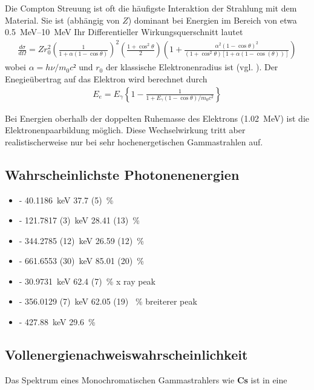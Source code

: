 Die Compton Streuung ist oft die häufigste Interaktion der Strahlung mit dem Material.
Sie ist (abhängig von $Z$) dominant bei Energien im Bereich von etwa \qtyrange{0.5}{10}{\MeV}
Ihr Differentieller Wirkungsquerschnitt lautet
\begin{align}
    \frac{d\sigma}{d \Omega} = Z r_0^2 \left(\frac{1}{1+\alpha(1-\cos\theta)}\right)^2 %
    \left(\frac{1+ \cos^2\theta}{2}\right)%
    \left(1+ \frac{\alpha^2(1-\cos \theta)^2}{(1+\cos^2 \theta)[1+\alpha(1-\cos(\theta))]}\right)
    \label{eq:wq_compton}
\end{align}%
wobei $\alpha = h \nu / m_0 c²$ und $r_0$ der klassische Elektronenradius ist (vgl. \cite{book:knoll}).
Der Enegieübertrag auf das Elektron wird berechnet durch
\begin{align}
    E_{e} = E_{\gamma} \left\{1- \frac{1}{1+ E_{\gamma}(1-\cos\theta)/m_0 c^2} \right\}
    \label{eq:ecompton}
\end{align} 


Bei Energien oberhalb der doppelten Ruhemasse des Elektrons (\qty{1.02}{\MeV}) ist die Elektronenpaarbildung möglich.
Diese Wechselwirkung tritt aber realistischerweise nur bei sehr hochenergetischen Gammastrahlen auf.


\subsection{Wahrscheinlichste Photonenenergien}
\begin{itemize} 
    \item[\ce   {^{152}Eu}] - \qty{ 40.1186 } {\keV} \qty{37.7 (5)}{\%} 
    \item[\ce   {^{152}Eu}] - \qty{121.7817 (3)} {\keV} \qty{28.41 (13)}{\%} 
    \item[\ce   {^{152}Eu}] - \qty{344.2785 (12)} {\keV} \qty{26.59 (12)}{\%}
    \item[\ce   {^{137}Cs}] - \qty{661.6553 (30)} {\keV} \qty{85.01 (20)}{\%}
    \item[\ce   {^{133}Ba}] - \qty{30.9731}{\keV} \qty{62.4 (7)}{\%} x ray peak
    \item[\ce   {^{133}Ba}] - \qty{356.0129 (7)}{\keV} \qty{62.05 (19) 	}{\%} breiterer peak
    \item[\ce   {^{125}Sb}] - \qty{427.88}{\keV} \qty{29.6}{\%}
\end{itemize}
\cite{web:lara}

\subsection{Vollenergienachweiswahrscheinlichkeit}
Das Spektrum eines Monochromatischen Gammastrahlers wie \textbf{Cs} ist in eine 

